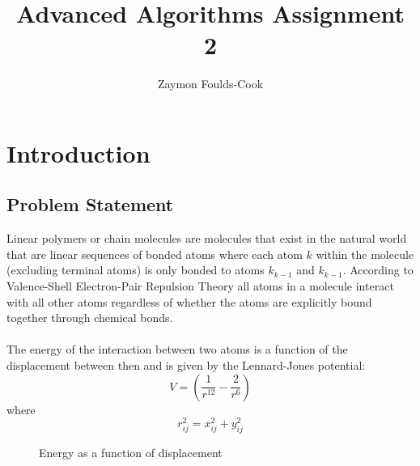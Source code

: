 \documentclass[11pt]{article}
\title{Advanced Algorithms Assignment 2}
\author{Zaymon Foulds-Cook}
\begin{document}
    
    \maketitle
    \clearpage
    
    \tableofcontents

    \clearpage
    
    \section{Introduction}
    \subsection{Problem Statement}
    \par
    Linear polymers or chain molecules are molecules that exist in the natural world that are linear sequences of bonded atoms where each atom $k$ within the molecule (excluding terminal atoms) is only bonded to atoms $k_{k - 1}$ and $k_{k - 1}$. According to Valence-Shell Electron-Pair Repulsion Theory all atoms in a molecule interact with all other atoms regardless of whether the atoms are explicitly bound together through chemical bonds.
    \\\\
    The energy of the interaction between two atoms is a function of the displacement between then and is given by the Lennard-Jones potential:
    \begin{equation}
        V = (\frac{1}{r^{12}} - \frac{2}{r^{6}})
    \end{equation}
    where
    \begin{equation}
        r^{2}_{ij} = x^{2}_{ij} + y^{2}_{ij}
    \end{equation}

    \begin{figure}[h]
        \caption{Energy as a function of displacement}
        \label{energy}
    \end{figure}
\end{document}
